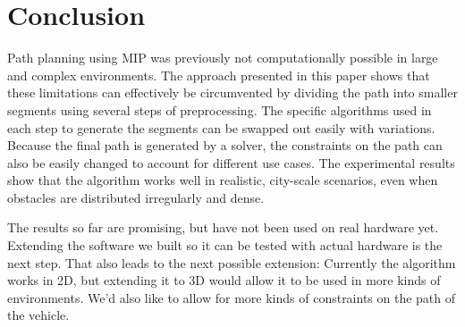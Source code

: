 \section{Conclusion}
Path planning using MIP was previously not computationally possible in large and complex environments. The approach presented in this paper shows that these limitations can effectively be circumvented by dividing the path into smaller segments using several steps of preprocessing. The specific algorithms used in each step to generate the segments can be swapped out easily with variations. Because the final path is generated by a solver, the constraints on the path can also be easily changed to account for different use cases. The experimental results show that the algorithm works well in realistic, city-scale scenarios, even when obstacles are distributed irregularly and dense.

The results so far are promising, but have not been used on real hardware yet. Extending the software we built so it can be tested with actual hardware is the next step. That also leads to the next possible extension: Currently the algorithm works in 2D, but extending it to 3D would allow it to be used in more kinds of environments. We'd also like to allow for more kinds of constraints on the path of the vehicle.